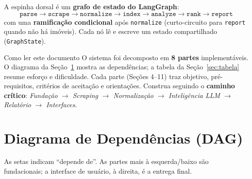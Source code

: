 \documentclass[12pt, a4paper]{article}
\begin{document}
A espinha dorsal é um \textbf{grafo de estado do LangGraph}:
\[
\texttt{parse} \to \texttt{scrape} \to \texttt{normalize}
\to \texttt{index} \to \texttt{analyze} \to \texttt{rank} \to \texttt{report}
\]
com uma \textbf{ramificação condicional} após \texttt{normalize} (curto-circuito
para \texttt{report} quando não há imóveis). Cada nó lê e escreve um estado
compartilhado (\texttt{GraphState}).

\begin{conceito}{Como ler este documento}
O sistema foi decomposto em \textbf{8 partes} implementáveis. O diagrama da
Seção~\ref{sec:dag} mostra as dependências; a tabela da Seção~\ref{sec:tabela}
resume esforço e dificuldade. Cada parte (Seções 4–11) traz objetivo,
pré-requisitos, critérios de aceitação e orientações. Construa seguindo o
\textbf{caminho crítico}: \emph{Fundação} $\to$ \emph{Scraping} $\to$
\emph{Normalização} $\to$ \emph{Inteligência LLM} $\to$ \emph{Relatório} $\to$
\emph{Interfaces}.
\end{conceito}

\section{Diagrama de Dependências (DAG)}
\label{sec:dag}

As setas indicam ``depende de''. As partes mais à esquerda/baixo são
fundacionais; a interface de usuário, à direita, é a entrega final.
\end{document}
